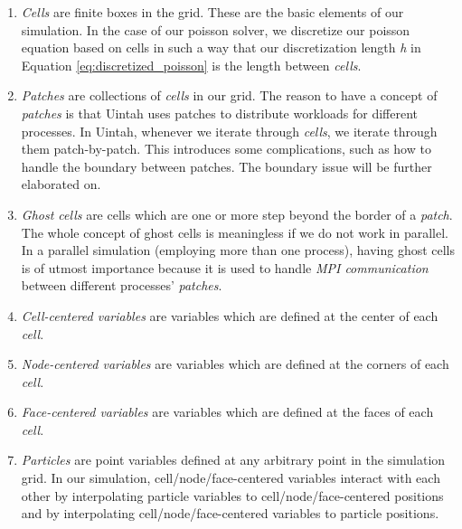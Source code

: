 \documentclass[notitlepage, 12pt]{article}
\begin{document}
\begin{enumerate}
\item \emph{Cells} are finite boxes in the grid. These are the basic elements of our simulation. In the case of our poisson solver, we discretize our poisson equation 
based on cells in such a way that our discretization length \emph{h} in Equation \ref{eq:discretized_poisson} is the length between \emph{cells}.
\item \emph{Patches} are collections of \emph{cells} in our grid. The reason to have a concept of \emph{patches} is that Uintah uses patches to distribute 
workloads for different processes. In Uintah, whenever we iterate through \emph{cells}, we iterate through them patch-by-patch. This introduces some complications, 
such as how to handle the boundary between patches. The boundary issue will be further elaborated on.
\item \emph{Ghost cells} are cells which are one or more step beyond the border of a \emph{patch}. The whole concept of ghost cells is meaningless if we 
do not work in parallel. In a parallel simulation (employing more than one process), having ghost cells is of utmost importance because it is used to handle 
\emph{MPI communication} between different processes' \emph{patches}.
\item \emph{Cell-centered variables} are variables which are defined at the center of each \emph{cell}.
\item \emph{Node-centered variables} are variables which are defined at the corners of each \emph{cell}.
\item \emph{Face-centered variables} are variables which are defined at the faces of each \emph{cell}.
\item \emph{Particles} are point variables defined at any arbitrary point in the simulation grid. In our simulation, cell/node/face-centered variables 
interact with each other by interpolating particle variables to cell/node/face-centered positions and by interpolating cell/node/face-centered variables to 
particle positions.
\end{enumerate}
\end{document}
